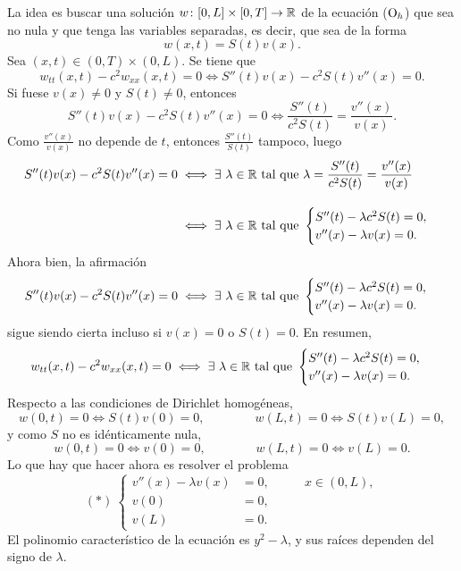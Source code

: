 \documentclass[a4paper, 12pt, extrafontsizes]{memoir}
\begin{document}
La idea es buscar una solución $w \colon [0,L] \times [0,T] \to \mathbb R$ de la ecuación ($\textup{O}_h$) que sea no nula y que tenga las variables separadas, es decir, que sea de la forma
\[w(x,t) = S(t)v(x).\]
Sea $(x,t) \in (0,T) \times (0,L)$. Se tiene que
\[w_{tt}(x,t)-c^2w_{xx}(x,t) = 0 \iff S''(t)v(x)-c^2S(t)v''(x) = 0.\]
Si fuese $v(x) \neq0$ y $S(t) \neq 0$, entonces
\[S''(t)v(x)-c^2S(t)v''(x) = 0 \iff \frac{S''(t)}{c^2S(t)} = \frac{v''(x)}{v(x)}.\]
Como $\frac{v''(x)}{v(x)}$ no depende de $t$, entonces $\frac{S''(t)}{S(t)}$ tampoco, luego
\begin{align*}
    S''(t)v(x)-c^2S(t)v''(x) = 0 &\iff \exists \ \lambda \in \mathbb R \textup{ tal que } \lambda = \frac{S''(t)}{c^2S(t)} = \frac{v''(x)}{v(x)} \\[10pt]
    &\iff  \exists \ \lambda \in \mathbb R \textup{ tal que } \begin{cases}
        S''(t) - \lambda c^2S(t) = 0, \\
        v''(x) - \lambda v(x) = 0.
    \end{cases}
\end{align*}
Ahora bien, la afirmación
\[S''(t)v(x)-c^2S(t)v''(x) = 0 \iff \exists \ \lambda \in \R \textup{ tal que } \begin{cases}
    S''(t) - \lambda c^2S(t) = 0, \\
    v''(x) - \lambda v(x) = 0.
\end{cases}\]
sigue siendo cierta incluso si $v(x) = 0$ o $S(t) = 0$. En resumen,
\[w_{tt}(x,t)-c^2w_{xx}(x,t) = 0 \iff \exists \ \lambda \in \mathbb R \textup{ tal que } \begin{cases}
    S''(t) - \lambda c^2S(t) = 0, \\
    v''(x) - \lambda v(x) = 0.
\end{cases}\]
Respecto a las condiciones de Dirichlet homogéneas,
\[w(0,t) = 0 \iff S(t)v(0) = 0, \qquad \qquad w(L,t) = 0 \iff S(t)v(L) = 0,\]
y como $S$ no es idénticamente nula,
\[w(0,t) = 0 \iff v(0) = 0, \qquad \qquad w(L,t) = 0 \iff v(L) = 0.\]
Lo que hay que hacer ahora es resolver el problema
\[(\ast) \ \left\{\begin{alignedat}{2}
    v''(x)-\lambda v(x) &= 0, \qquad &x \in (0,L),\\
    v(0) &= 0,& \\
    v(L) &= 0.&
\end{alignedat}\right.\]
El polinomio característico de la ecuación es $y^2-\lambda$, y sus raíces dependen del signo de $\lambda$.
\end{document}
